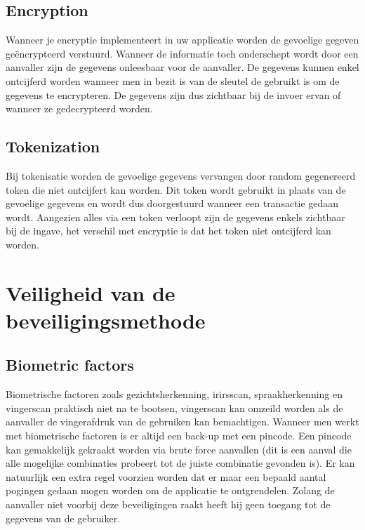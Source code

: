 \subsection{Encryption}
Wanneer je encryptie implementeert in uw applicatie worden de gevoelige gegeven geëncrypteerd verstuurd. Wanneer de informatie toch onderschept wordt door een aanvaller zijn de gegevens onleesbaar voor de aanvaller. De gegevens kunnen enkel ontcijferd worden wanneer men in bezit is van de sleutel de gebruikt is om de gegevens te encrypteren. De gegevens zijn dus zichtbaar bij de invoer ervan of wanneer ze gedecrypteerd worden.

\subsection{Tokenization}
Bij tokenisatie worden de gevoelige gegevens vervangen door random gegenereerd token die niet ontcijfert kan worden. Dit token wordt gebruikt in plaats van de gevoelige gegevens en wordt dus doorgestuurd wanneer een transactie gedaan wordt. Aangezien alles via een token verloopt zijn de gegevens enkels zichtbaar bij de ingave, het verschil met encryptie is dat het token niet ontcijferd kan worden.

\section{Veiligheid van de beveiligingsmethode}
\label{sec:veiligheid}

\subsection{Biometric factors}
Biometrische factoren zoals gezichtsherkenning, irirsscan, spraakherkenning en vingerscan praktisch niet na te bootsen, vingerscan kan omzeild worden als de aanvaller de vingerafdruk van de gebruiken kan bemachtigen. Wanneer men werkt met biometrische factoren is er altijd een back-up met een pincode. Een pincode kan gemakkelijk gekraakt worden via brute force aanvallen (dit is een aanval die alle mogelijke combinaties probeert tot de juiste combinatie gevonden is). Er kan natuurlijk een extra regel voorzien worden dat er maar een bepaald aantal pogingen gedaan mogen worden om de applicatie te ontgrendelen. Zolang de aanvaller niet voorbij deze beveiligingen raakt heeft hij geen toegang tot de gegevens van de gebruiker.
 
